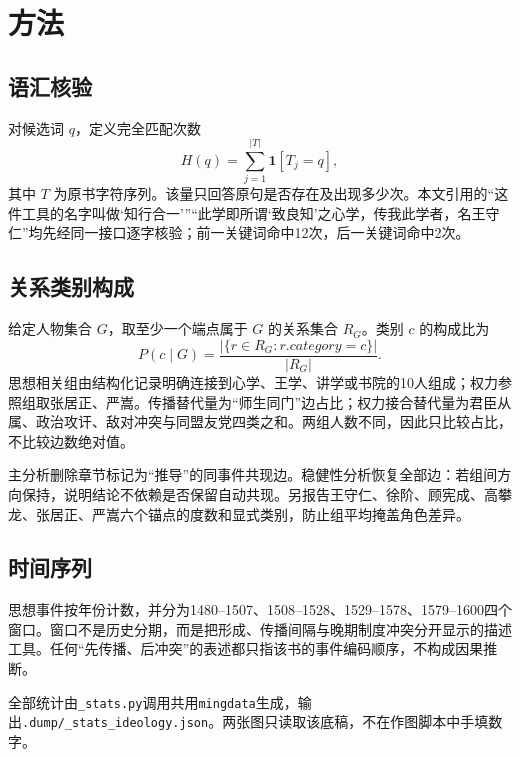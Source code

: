 \section{方法}

\subsection{语汇核验}

对候选词 $q$，定义完全匹配次数
\begin{equation}
H(q)=\sum_{j=1}^{|T|}\mathbf{1}[T_j=q],
\end{equation}
其中 $T$ 为原书字符序列。该量只回答原句是否存在及出现多少次。本文引用的“这件工具的名字叫做‘知行合一’”“此学即所谓‘致良知’之心学，传我此学者，名王守仁”均先经同一接口逐字核验；前一关键词命中12次，后一关键词命中2次。

\subsection{关系类别构成}

给定人物集合 $G$，取至少一个端点属于 $G$ 的关系集合 $R_G$。类别 $c$ 的构成比为
\begin{equation}
P(c\mid G)=\frac{|\{r\in R_G:r.category=c\}|}{|R_G|}.
\end{equation}
思想相关组由结构化记录明确连接到心学、王学、讲学或书院的10人组成；权力参照组取张居正、严嵩。传播替代量为“师生同门”边占比；权力接合替代量为君臣从属、政治攻讦、敌对冲突与同盟友党四类之和。两组人数不同，因此只比较占比，不比较边数绝对值。

主分析删除章节标记为“推导”的同事件共现边。稳健性分析恢复全部边：若组间方向保持，说明结论不依赖是否保留自动共现。另报告王守仁、徐阶、顾宪成、高攀龙、张居正、严嵩六个锚点的度数和显式类别，防止组平均掩盖角色差异。

\subsection{时间序列}

思想事件按年份计数，并分为1480--1507、1508--1528、1529--1578、1579--1600四个窗口。窗口不是历史分期，而是把形成、传播间隔与晚期制度冲突分开显示的描述工具。任何“先传播、后冲突”的表述都只指该书的事件编码顺序，不构成因果推断。

全部统计由\texttt{\_stats.py}调用共用\texttt{mingdata}生成，输出\texttt{.dump/\_stats\_ideology.json}。两张图只读取该底稿，不在作图脚本中手填数字。
